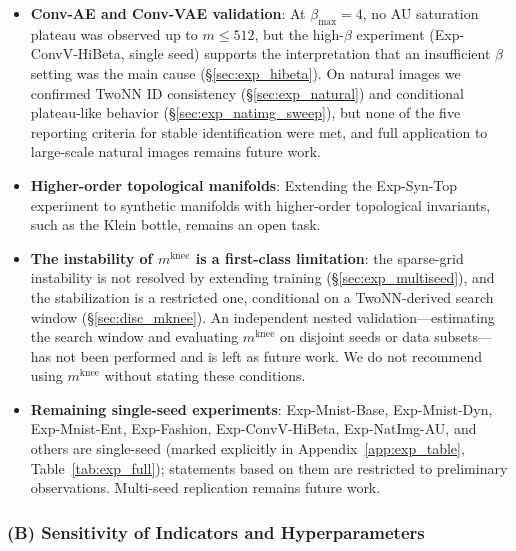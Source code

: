 \documentclass[make,article,submit,pdftex,moreauthors]{Definitions/mdpi}
\newcommand{\mknee}{m^{\mathrm{knee}}}
\begin{document}
\begin{itemize}
  \item \textbf{Conv-AE and Conv-VAE validation}:
        At $\beta_{\max}=4$, no AU saturation plateau was observed up to $m \leq 512$,
        but the high-$\beta$ experiment (Exp-ConvV-HiBeta, single seed) supports the
        interpretation that an insufficient $\beta$ setting was the main cause
        (\S\ref{sec:exp_hibeta}).
        On natural images we confirmed TwoNN ID consistency
        (\S\ref{sec:exp_natural}) and conditional plateau-like behavior
        (\S\ref{sec:exp_natimg_sweep}), but none of the five reporting criteria for
        stable identification were met, and full application to large-scale natural
        images remains future work.
  \item \textbf{Higher-order topological manifolds}: Extending the Exp-Syn-Top
        experiment to synthetic manifolds with higher-order topological invariants,
        such as the Klein bottle, remains an open task.
  \item \textbf{The instability of $\mknee$ is a first-class limitation}:
        the sparse-grid instability is not resolved by extending training
        (\S\ref{sec:exp_multiseed}), and the stabilization is a restricted one,
        conditional on a TwoNN-derived search window (\S\ref{sec:disc_mknee}).
        An independent nested validation---estimating the search window and evaluating
        $\mknee$ on disjoint seeds or data subsets---has not been performed and is
        left as future work.
        We do not recommend using $\mknee$ without stating these conditions.
  \item \textbf{Remaining single-seed experiments}:
        Exp-Mnist-Base, Exp-Mnist-Dyn, Exp-Mnist-Ent, Exp-Fashion, Exp-ConvV-HiBeta,
        Exp-NatImg-AU, and others are single-seed (marked explicitly in
        Appendix~\ref{app:exp_table}, Table~\ref{tab:exp_full}); statements based on
        them are restricted to preliminary observations.
        Multi-seed replication remains future work.
\end{itemize}

\subsubsection*{(B) Sensitivity of Indicators and Hyperparameters}
\end{document}
